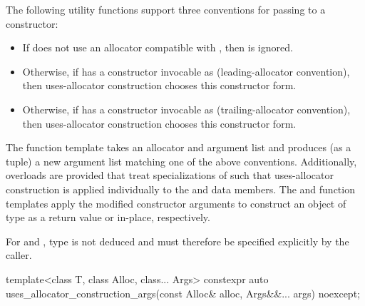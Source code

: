 \pnum
The following utility functions support
three conventions for passing  to a constructor:
\begin{itemize}
\item
  If  does not use an allocator compatible with ,
  then  is ignored.
\item
  Otherwise, if  has a constructor invocable as
   (leading-allocator convention),
  then uses-allocator construction chooses this constructor form.
\item
  Otherwise, if  has a constructor invocable as
   (trailing-allocator convention),
  then uses-allocator construction chooses this constructor form.
\end{itemize}

\pnum
The  function template
takes an allocator and argument list and
produces (as a tuple) a new argument list matching one of the above conventions.
Additionally, overloads are provided
that treat specializations of 
such that uses-allocator construction is applied individually
to the  and  data members.
The  and
 function templates
apply the modified constructor arguments
to construct an object of type 
as a return value or in-place, respectively.
\begin{note}
For  and
, type 
is not deduced and must therefore be specified explicitly by the caller.
\end{note}

%
\begin{itemdecl}
template<class T, class Alloc, class... Args>
  constexpr auto uses_allocator_construction_args(const Alloc& alloc,
                                                  Args&&... args) noexcept;
\end{itemdecl}

